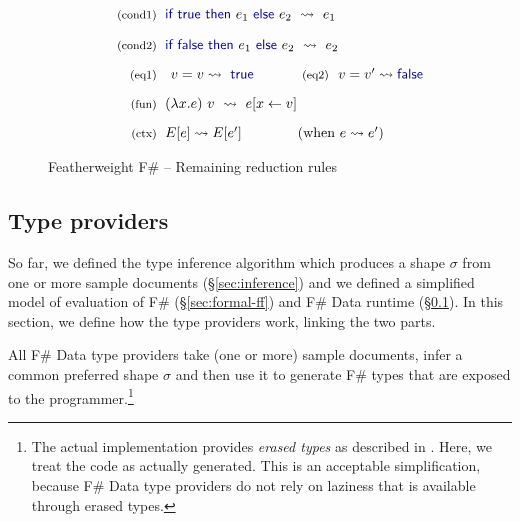 \documentclass[10pt,preprint,blind,clearpagebib]{sigplanconf}
\newcommand{\kvd}[1]{\textnormal{\textcolor{kvdclr}{\sffamily #1}}}
\newcommand{\reduce}{\rightsquigarrow}
\begin{document}
\begin{figure}
\begin{equation*}
\begin{array}{rl}
 \\[-0.2em]
 \textnormal{\footnotesize{(cond1)}}&
 \hspace{-0.4em}
 \kvd{if}~\kvd{true}~\kvd{then}~e_1~\kvd{else}~e_2 ~\reduce~ e_1 \\
 \\[-0.2em]
 \textnormal{\footnotesize{(cond2)}}&
 \hspace{-0.4em}
 \kvd{if}~\kvd{false}~\kvd{then}~e_1~\kvd{else}~e_2 ~\reduce~ e_2 \\
 \\[-0.3em]
 \textnormal{\footnotesize{(eq1)}}&
 v=v\reduce\kvd{true} \qquad \textnormal{\footnotesize{(eq2)}}~~v=v'\reduce\kvd{false}\\
 \\[-0.3em]
 \textnormal{\footnotesize{(fun)}}&
 \hspace{-0.4em}
 (\lambda x.e)~v ~\reduce~ e[x\leftarrow v] \\
 \\[-0.3em]
 \textnormal{\footnotesize{(ctx)}}&
 \hspace{-0.4em}
  E[e] \reduce E[e'] \qquad\qquad(\textnormal{when}~e \reduce e')\\
\end{array}
\end{equation*}

\caption{Featherweight F\# -- Remaining reduction rules}
\label{fig:ff-reduction}
\end{figure}


\subsection{Type providers}
\label{sec:formal-tp}

So far, we defined the type inference algorithm which produces a shape $\sigma$ from one 
or more sample documents (\S\ref{sec:inference}) and we defined a simplified model of evaluation
of F\# (\S\ref{sec:formal-ff}) and F\# Data runtime (\S\ref{sec:formal-tp}). In this section, we 
define how the type providers work, linking the two parts.

All F\# Data type providers take (one or more) sample documents, infer a common preferred shape $\sigma$
and then use it to generate F\# types that are exposed to the programmer.\footnote{The actual 
implementation provides \emph{erased types} as described in \cite{fsharp-typeprov}. Here, we treat 
the code as actually generated. This is an acceptable simplification, because F\# Data type providers 
do not rely on laziness that is available through erased types.}
\end{document}

